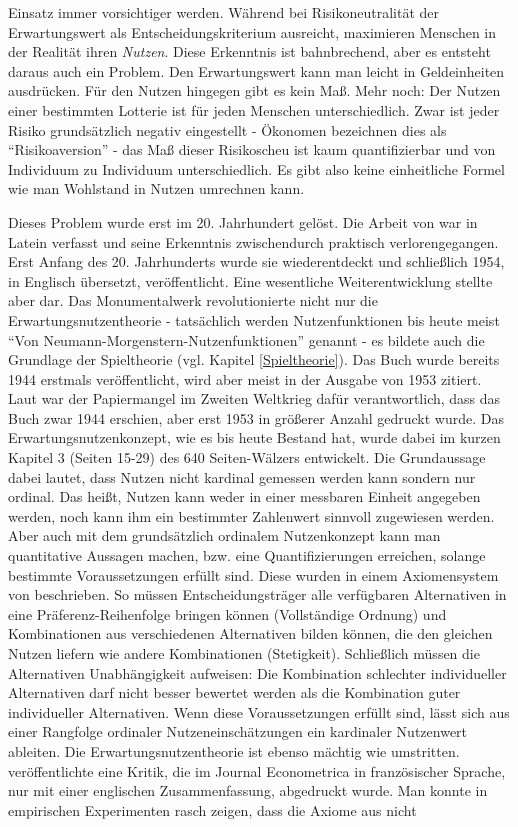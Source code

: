 Einsatz immer vorsichtiger werden. Während bei Risikoneutralität der Erwartungswert als Entscheidungskriterium ausreicht, maximieren Menschen in der Realität ihren \textit{Nutzen}. Diese Erkenntnis ist bahnbrechend, aber es entsteht daraus auch ein Problem. Den Erwartungswert kann man leicht in Geldeinheiten ausdrücken. Für den Nutzen hingegen gibt es kein Maß. Mehr noch: Der Nutzen einer bestimmten Lotterie ist für jeden Menschen unterschiedlich. Zwar ist jeder Risiko grundsätzlich negativ eingestellt - Ökonomen bezeichnen dies als "`Risikoaversion"' - das Maß dieser Risikoscheu ist kaum quantifizierbar und von Individuum zu Individuum unterschiedlich. Es gibt also keine einheitliche Formel wie man Wohlstand in Nutzen umrechnen kann. 

Dieses Problem wurde erst im 20. Jahrhundert gelöst. Die Arbeit von \textcite{Bernoulli1738} war in Latein verfasst und seine Erkenntnis zwischendurch praktisch verlorengegangen. Erst Anfang des 20. Jahrhunderts wurde sie wiederentdeckt und schließlich 1954, in Englisch übersetzt, veröffentlicht. Eine wesentliche Weiterentwicklung stellte aber \textcite{Morgenstern1944} dar. Das Monumentalwerk revolutionierte nicht nur die Erwartungsnutzentheorie - tatsächlich werden Nutzenfunktionen bis heute meist "`Von Neumann-Morgenstern-Nutzenfunktionen"' genannt - es bildete auch die Grundlage der Spieltheorie (vgl. Kapitel \ref{Spieltheorie}). Das Buch wurde bereits 1944 erstmals veröffentlicht, wird aber meist in der Ausgabe von 1953 zitiert. Laut \textcite[S. 235]{Bernstein1996} war der Papiermangel im Zweiten Weltkrieg dafür verantwortlich, dass das Buch zwar 1944 erschien, aber erst 1953 in größerer Anzahl gedruckt wurde. Das Erwartungsnutzenkonzept, wie es bis heute Bestand hat, wurde dabei im kurzen Kapitel 3 (Seiten 15-29) des 640 Seiten-Wälzers entwickelt. Die Grundaussage dabei lautet, dass Nutzen nicht kardinal gemessen werden kann sondern nur ordinal. Das heißt, Nutzen kann weder in einer messbaren Einheit angegeben werden, noch kann ihm ein bestimmter Zahlenwert sinnvoll zugewiesen werden. Aber auch mit dem grundsätzlich ordinalem Nutzenkonzept kann man quantitative Aussagen machen, bzw. eine Quantifizierungen erreichen, solange bestimmte Voraussetzungen erfüllt sind. Diese wurden in einem Axiomensystem von \textcite[S. 26f]{Morgenstern1944} beschrieben. So müssen Entscheidungsträger alle verfügbaren Alternativen in eine Präferenz-Reihenfolge bringen können (Vollständige Ordnung) und Kombinationen aus verschiedenen Alternativen bilden können, die den gleichen Nutzen liefern wie andere Kombinationen (Stetigkeit). Schließlich müssen die Alternativen Unabhängigkeit aufweisen: Die Kombination schlechter individueller Alternativen darf nicht besser bewertet werden als die Kombination guter individueller Alternativen. Wenn diese Voraussetzungen erfüllt sind, lässt sich aus einer Rangfolge ordinaler Nutzeneinschätzungen ein kardinaler Nutzenwert ableiten. Die Erwartungsnutzentheorie ist ebenso mächtig wie umstritten. \textcite{Allais1953} veröffentlichte eine Kritik, die im Journal Econometrica in französischer Sprache, nur mit einer englischen Zusammenfassung, abgedruckt wurde. Man konnte in empirischen Experimenten rasch zeigen, dass die Axiome aus \textcite{Morgenstern1944} nicht 